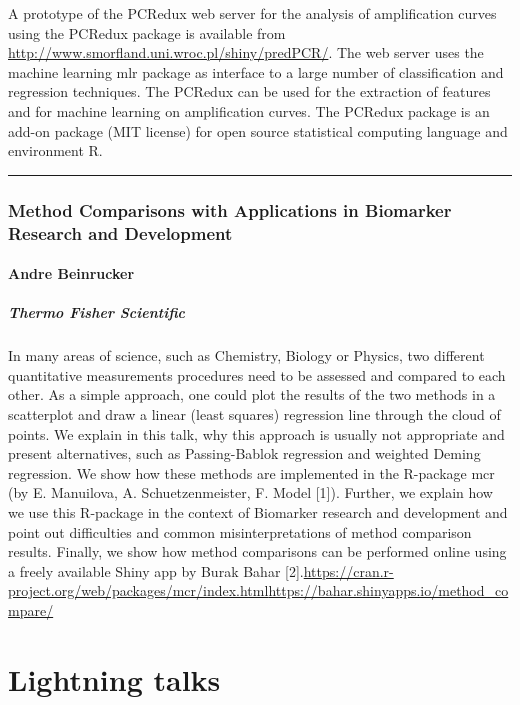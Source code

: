 \documentclass [12pt]{article}
\begin{document}
A prototype of the PCRedux web server for the analysis of amplification curves using the PCRedux package is available from \url{http://www.smorfland.uni.wroc.pl/shiny/predPCR/}. The web server uses the machine learning mlr package as interface to a large number of classification and regression techniques. The PCRedux can be used for the extraction of features and for machine learning on amplification curves. The PCRedux package is an add-on package (MIT license) for open source statistical computing language and environment R.

\noindent\rule{\textwidth}{1pt}
\section{Method Comparisons with Applications in Biomarker Research and Development}
\subsection*{Andre Beinrucker}
\subsubsection*{Thermo Fisher Scientific}

In many areas of science, such as Chemistry, Biology or Physics, two different quantitative measurements procedures need to be assessed and compared to each other. As a simple approach, one could plot the results of the two methods in a scatterplot and draw a linear (least squares) regression line through the cloud of points. We explain in this talk, why this approach is usually not appropriate and present alternatives, such as Passing-Bablok regression and weighted Deming regression. We show how these methods are implemented in the R-package mcr (by E. Manuilova, A. Schuetzenmeister, F. Model [1]). Further, we explain how we use this R-package in the context of Biomarker research and development and point out difficulties and common misinterpretations of method comparison results. Finally, we show how method comparisons can be performed online using a freely available Shiny app by Burak Bahar [2].\newline
[1] \url{https://cran.r-project.org/web/packages/mcr/index.html}\newline
[2] \url{https://bahar.shinyapps.io/method_compare/}
\newpage
{}
\part{Lightning talks}
\end{document}
